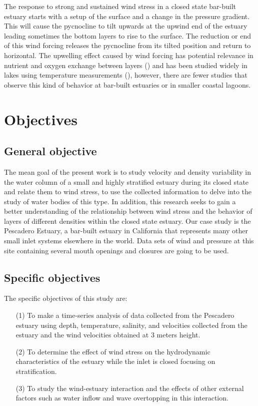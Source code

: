 \documentclass[11pt,letterpaper]{article}
\begin{document}
The response to strong and sustained wind stress in a closed state bar-built estuary starts with a setup of the surface and a change in the pressure gradient. This will cause the pycnocline to tilt upwards at the upwind end of the estuary leading sometimes the bottom layers to rise to the surface. The reduction or end of this wind forcing releases the pycnocline from its tilted position and return to horizontal. The upwelling effect caused by wind forcing has potential relevance in nutrient and oxygen exchange between layers (\cite{Kelly2018}) and has been studied widely in lakes using temperature measurements (\cite{Coman2012, delafuente2010strong, roberts2021setup}), however, there are fewer studies that observe this kind of behavior at bar-built estuaries or in smaller coastal lagoons. \\

\section{Objectives}

\subsection{General objective}

The mean goal of the present work is to study velocity and density variability in the water column of a small and highly stratified estuary during its closed state and relate them to wind stress, to use the collected information to delve into the study of water bodies of this type. In addition, this research seeks to gain a better understanding of the relationship between wind stress and the behavior of layers of different densities within the closed state estuary.  Our case study is the Pescadero Estuary, a bar-built estuary in California that represents many other small inlet systems elsewhere in the world. Data sets of wind and pressure at this site containing several mouth openings and closures are going to be used.\\

\subsection{Specific objectives}

The specific objectives of this study are:
\begin{enumerate}
    \item [(1)] To make a time-series analysis of data collected from the Pescadero estuary using depth, temperature, salinity, and velocities collected from the estuary and the wind velocities obtained at 3 meters height.
    \item [(2)] To determine the effect of wind stress on the hydrodynamic characteristics of the estuary while the inlet is closed focusing on stratification.
    \item [(3)] To study the wind-estuary interaction and the effects of other external factors such as water inflow and wave overtopping in this interaction.
\end{enumerate}
\end{document}
